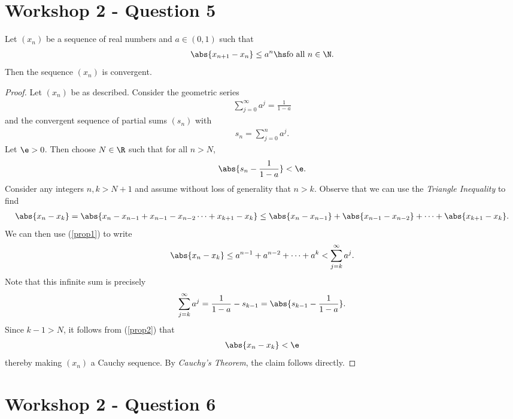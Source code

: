 \documentclass{article}
\begin{document}
\section{Workshop 2 - Question 5}

\begin{claim}
	Let $(x_n)$ be a sequence of real numbers and $a\in(0,1)$ such that
	\begin{align}
		\label{prop1}
		\abs{x_{n+1}-x_n} \leq a^n\hs\text{fo all }n\in\N.
	\end{align}
	Then the sequence $(x_n)$ is convergent.
\end{claim}
\begin{proof}
	Let $(x_n)$ be as described. Consider the geometric series
	\begin{align*}
		\sum_{j=0}^\infty a^j = \frac{1}{1-a}
	\end{align*}
	and the convergent sequence of partial sums $(s_n)$ with
	\begin{align*}
		s_n = \sum_{j=0}^n a^j.
	\end{align*}
	Let $\e>0$. Then choose $N\in\R$ such that for all $n>N$,
	\begin{align}
		\label{prop2}
		\abs{s_n-\frac{1}{1-a}} < \e.
	\end{align}
	Consider any integers $n,k>N+1$ and assume without loss of generality that $n>k$.
	Observe that we can use the \emph{Triangle Inequality} to find
	\begin{align*}
		\abs{x_n - x_k} = \abs{x_n - x_{n-1} + x_{n-1} - x_{n-2} \cdots + x_{k+1} - x_k}
		\leq \abs{x_n-x_{n-1}} + \abs{x_{n-1} - x_{n-2}} + \cdots + \abs{x_{k+1} - x_k}.
	\end{align*}
	We can then use (\ref{prop1}) to write
	\begin{align*}
		\abs{x_n - x_k} \leq a^{n-1} + a^{n-2} + \cdots + a^k < \sum_{j=k}^\infty a^j.
	\end{align*}
	Note that this infinite sum is precisely
	\begin{align*}
		\sum_{j=k}^\infty a^j = \frac{1}{1-a}-s_{k-1}=\abs{s_{k-1}-\frac{1}{1-a}}.
	\end{align*}
	Since $k-1>N$, it follows from (\ref{prop2}) that
	\begin{align*}
		\abs{x_n - x_k} < \e
	\end{align*}
	thereby making $(x_n)$ a Cauchy sequence. By \emph{Cauchy's Theorem}, the claim follows directly.
\end{proof}

\section{Workshop 2 - Question 6}
\end{document}
